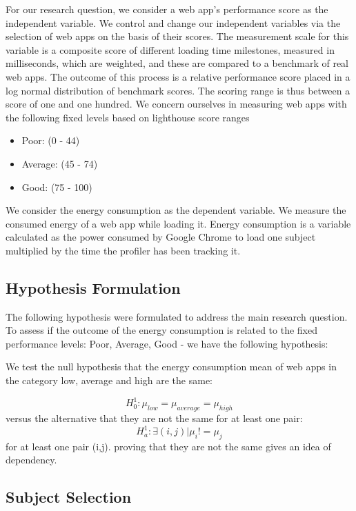 For our research question, we consider a web app's performance score as the independent variable. We control and change our independent variables via the selection of web apps on the basis of their scores. The measurement scale for this variable is a composite score of different loading time milestones, measured in milliseconds, which are weighted, and these are compared to a benchmark of real web apps. The outcome of this process is a relative performance score placed in a log normal distribution of benchmark scores. 
The scoring range is thus between a score of one and one hundred. We concern ourselves in measuring web apps with the following fixed levels based on lighthouse score ranges \cite{WEBSITE:13}

\begin{itemize}
\item Poor: (0 - 44)
\item Average: (45 - 74)
\item Good: (75 - 100)
\newline
\end{itemize}

We consider the energy consumption as the dependent variable. We measure the consumed energy of a web app while loading it. Energy consumption is a variable calculated as the power consumed by Google Chrome to load one subject multiplied by the time the profiler has been tracking it.
\newline


\subsection{Hypothesis Formulation}
The following hypothesis were formulated to address the main research question.
To assess if the outcome of the energy consumption is related to the fixed performance levels: Poor, Average, Good - we have the following hypothesis: \newline

We test the null hypothesis that the energy consumption mean of web apps in the category low, average and high are the same: 

\[ H_0^1: \mu_{low} = \mu_{average} = \mu_{high} \]
versus the alternative that they are not the same for at least one pair: \[ H_{a}^1: \exists (i,j) | \mu_{i} != \mu_{j} \]  for at least one pair (i,j).  proving that they are not the same gives an idea of dependency.

\subsection{Subject Selection}
	
